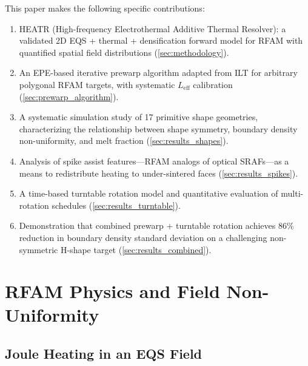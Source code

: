 \documentclass[5p,times]{elsarticle}
\newcommand{\Leff}{L_{\mathrm{eff}}}
\begin{document}
This paper makes the following specific contributions:
\begin{enumerate}
\item HEATR (High-frequency Electrothermal Additive Thermal Resolver):
      a validated 2D EQS + thermal + densification forward model for
      RFAM with quantified spatial field distributions (\cref{sec:methodology}).
\item An EPE-based iterative prewarp algorithm adapted from ILT for
      arbitrary polygonal RFAM targets, with systematic $\Leff$
      calibration (\cref{sec:prewarp_algorithm}).
\item A systematic simulation study of 17 primitive shape geometries,
      characterizing the relationship between shape symmetry, boundary
      density non-uniformity, and melt fraction
      (\cref{sec:results_shapes}).
\item Analysis of spike assist features---RFAM analogs of
      optical SRAFs---as a means to redistribute heating to under-sintered
      faces (\cref{sec:results_spikes}).
\item A time-based turntable rotation model and quantitative evaluation
      of multi-rotation schedules (\cref{sec:results_turntable}).
\item Demonstration that combined prewarp + turntable rotation achieves
      86\% reduction in boundary density standard deviation on a
      challenging non-symmetric H-shape target
      (\cref{sec:results_combined}).
\end{enumerate}

\FloatBarrier
\section{RFAM Physics and Field Non-Uniformity}
\label{sec:physics}

\subsection{Joule Heating in an EQS Field}
\end{document}
